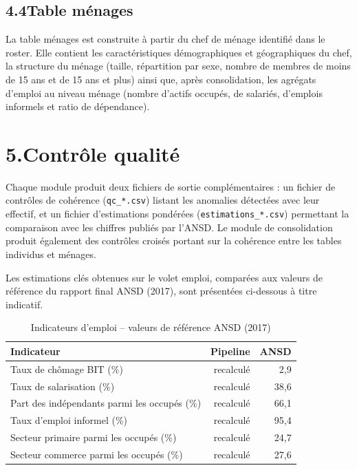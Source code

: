 \documentclass[12pt,a4paper]{article}
\begin{document}
\subsection*{4.4\quad Table ménages}

La table ménages est construite à partir du chef de ménage identifié dans le
roster. Elle contient les caractéristiques démographiques et géographiques du
chef, la structure du ménage (taille, répartition par sexe, nombre de membres
de moins de 15 ans et de 15 ans et plus) ainsi que, après consolidation, les
agrégats d'emploi au niveau ménage (nombre d'actifs occupés, de salariés,
d'emplois informels et ratio de dépendance).

\section*{5.\quad Contrôle qualité}

Chaque module produit deux fichiers de sortie complémentaires : un fichier de
contrôles de cohérence (\texttt{qc\_*.csv}) listant les anomalies détectées avec
leur effectif, et un fichier d'estimations pondérées (\texttt{estimations\_*.csv})
permettant la comparaison avec les chiffres publiés par l'ANSD. Le module de
consolidation produit également des contrôles croisés portant sur la cohérence
entre les tables individus et ménages.

Les estimations clés obtenues sur le volet emploi, comparées aux valeurs de
référence du rapport final ANSD (2017), sont présentées ci-dessous à titre
indicatif.

\begin{table}[h!]
\centering
\begin{tabularx}{\linewidth}{Xrr}
\toprule
\textbf{Indicateur} & \textbf{Pipeline} & \textbf{ANSD} \\
\midrule
Taux de chômage BIT (\%)                    & recalculé & 2,9 \\
Taux de salarisation (\%)                   & recalculé & 38,6 \\
Part des indépendants parmi les occupés (\%) & recalculé & 66,1 \\
Taux d'emploi informel (\%)                 & recalculé & 95,4 \\
Secteur primaire parmi les occupés (\%)     & recalculé & 24,7 \\
Secteur commerce parmi les occupés (\%)     & recalculé & 27,6 \\
\bottomrule
\end{tabularx}
\caption{Indicateurs d'emploi -- valeurs de référence ANSD (2017)}
\end{table}
\end{document}
